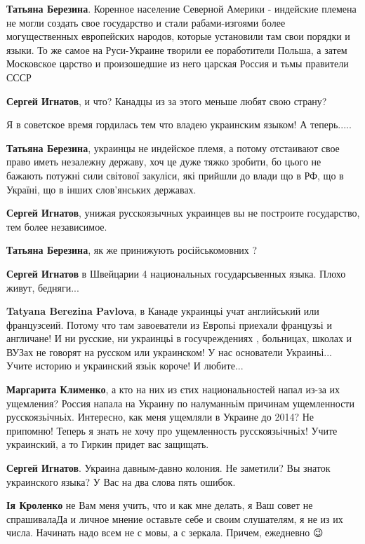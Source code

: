 \begin{itemize}
{\begin{itemize}
\textbf{Татьяна Березина}. Коренное население Северной Америки - индейские
племена не могли создать свое государство и стали рабами-изгоями более
могущественных европейских народов, которые установили там свои порядки и
языки. То же самое на Руси-Украине творили ее поработители Польша, а затем
Московское царство и произошедшие из него царская Россия и тьмы правители СССР

\textbf{Сергей Игнатов}, и что? Канадцы из за этого меньше любят свою страну?

Я в советское время гордилась тем что владею украинским языком! А теперь.....

\textbf{Татьяна Березина}, украинцы не индейское племя, а потому отстаивают
свое право иметь незалежну державу, хоч це дуже тяжко зробити, бо цього не
бажають потужні сили світової закуліси, які прийшли до влади що в РФ, що в
Україні, що в інших слов'янських державах.

\textbf{Сергей Игнатов}, унижая русскоязычных украинцев вы не построите государство, тем более независимое.

\textbf{Татьяна Березина}, як же принижують російськомовних ?

\textbf{Сергей Игнатов} в Швейцарии 4 национальных государсьвенных языка. Плохо живут, бедняги...

\textbf{Tatyana Berezina Pavlova}, в Канаде украинцьі учат английський или
французсеий. Потому что там завоеватели из Европьі приехали французьі и
англичане! И ни русские, ни украинцьі в госучреждениях , больницах, школах и
ВУЗах не говорят на русском или украинском! У нас основатели Украиньі... Учите
историю и украинский язьік короче! И любите...

\textbf{Маргарита Клименко}, а кто на них из єтих национальностей напал из-за
их ущемления? Россия напала на Украину по налуманньім причинам ущемленности
русскоязьічньіх. Интересно, как меня ущемляли в Украине до 2014? Не припомню!
Теперь я знать не хочу про ущемленность русскоязьічньіх! Учите украинский, а то
Гиркин придет вас защищать.

\textbf{Сергей Игнатов}. Украина давным-давно колония. Не заметили? Вы знаток украинского языка? У Вас на два слова пять ошибок.

\textbf{Ія Кроленко} не Вам меня учить, что и как мне делать, я Ваш совет не
спрашивала\Laughey[1.0] Да и личное мнение оставьте себе и своим слушателям, я не из их
числа. Начинать надо всем не с мовы, а с зеркала. Причем, ежедневно 😉


\end{itemize}}
\end{itemize}
